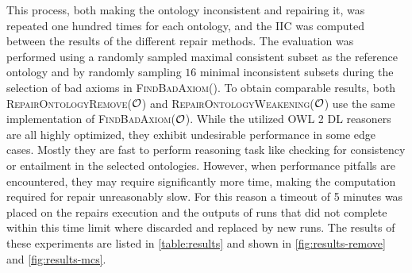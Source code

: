This process, both making the ontology inconsistent and repairing it, was repeated one hundred times for each ontology, and the IIC was computed between the results of the different repair methods. The evaluation was performed using a randomly sampled maximal consistent subset as the reference ontology and by randomly sampling $16$ minimal inconsistent subsets during the selection of bad axioms in \textsc{FindBadAxiom}(\Omc). To obtain comparable results, both \textsc{RepairOntologyRemove}($\mathcal{O}$) and \textsc{RepairOntologyWeakening}($\mathcal{O}$) use the same implementation of \textsc{FindBadAxiom}($\mathcal{O}$). While the utilized OWL 2 DL reasoners are all highly optimized, they exhibit undesirable performance in some edge cases. Mostly they are fast to perform reasoning task like checking for consistency or entailment in the selected ontologies. However, when performance pitfalls are encountered, they may require significantly more time, making the computation required for repair unreasonably slow. For this reason a timeout of 5 minutes was placed on the repairs execution and the outputs of runs that did not complete within this time limit where discarded and replaced by new runs. The results of these experiments are listed in \cref{table:results} and shown in \cref{fig:results-remove} and \cref{fig:results-mcs}.


